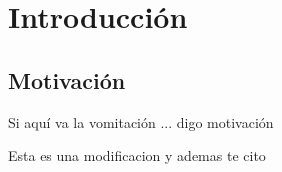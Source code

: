 \chapter{Introducción}
\label{intro}

\section{Motivación}

Si aquí va la vomitación ... digo motivación 

Esta es una modificacion y ademas te cito \cite{vreman2014comparison}